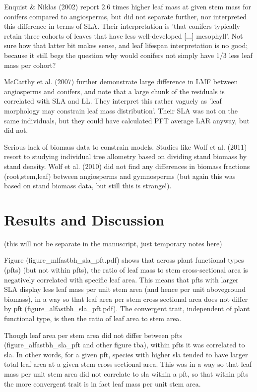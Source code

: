 \documentclass[a4paper]{article}
\begin{document}
Enquist & Niklas (2002) report 2.6 times higher leaf mass at given stem mass for conifers compared to angiosperms, but did not separate further, nor interpreted this difference in terms of SLA. Their interpretation is 'that conifers typically retain three cohorts of leaves that have less well-developed [...] mesophyll'. Not sure how that latter bit makes sense, and leaf lifespan interpretation is no good; because it still begs the question why would conifers not simply have 1/3 less leaf mass per cohort? 

McCarthy et al. (2007) further demonstrate large difference in LMF between angiosperms and conifers, and note that a large chunk of the residuals is correlated with SLA and LL. They interpret this rather vaguely as 'leaf morphology may constrain leaf mass distribution'. Their SLA was not on the same individuals, but they could have calculated PFT average LAR anyway, but did not.

Serious lack of biomass data to constrain models. Studies like Wolf et al. (2011) resort to studying individual tree allometry based on dividing stand biomass by stand density. Wolf et al. (2010) did not find any differences in biomass fractions (root,stem,leaf) between angiosperms and gymnosperms (but again this was based on stand biomass data, but still this is strange!).




\section{Results and Discussion}
(this will not be separate in the manuscript, just temporary notes here)

Figure (figure\_mlfastbh\_sla\_pft.pdf) shows that across plant functional types (pfts) (but not within pfts), the ratio of leaf mass to stem cross-sectional area is negatively correlated with specific leaf area. This means that pfts with larger SLA display less leaf mass per unit stem area (and hence per unit aboveground biomass), in a way so that leaf area per stem cross sectional area does not differ by pft (figure\_alfastbh\_sla\_pft.pdf). The convergent trait, independent of plant functional type, is then the ratio of leaf area to stem area.

Though leaf area per stem area did not differ between pfts (figure\_alfastbh\_sla\_pft and other figure tba), within pfts it was correlated to sla. In other words, for a given pft, species with higher sla tended to have larger total leaf area at a given stem cross-sectional area. This was in a way so that leaf mass per unit stem area did not correlate to sla within a pft, so that within pfts the more convergent trait is in fact leaf mass per unit stem area.
\end{document}
